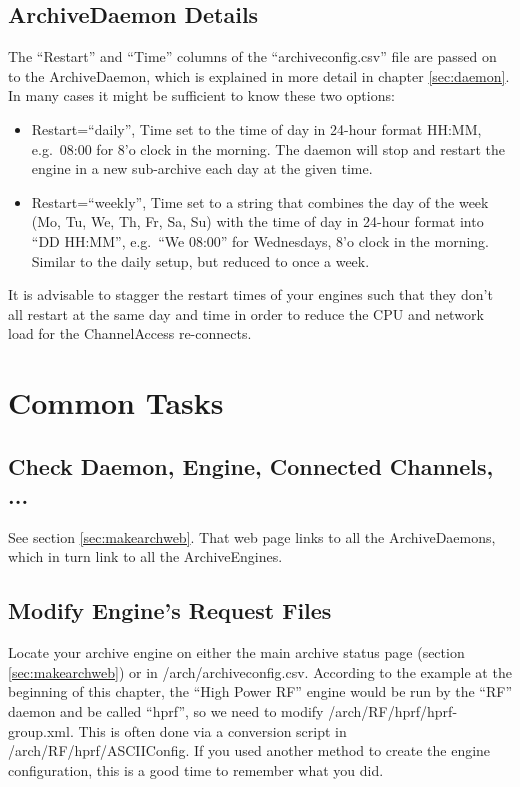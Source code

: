 \subsection{ArchiveDaemon Details}
The ``Restart'' and ``Time'' columns of the ``archiveconfig.csv'' file
are passed on to the ArchiveDaemon, which is explained in more detail
in chapter \ref{sec:daemon}. In many cases it might be sufficient to
know these two options:
\begin{itemize}
\item Restart=``daily'', Time set to the time of day in 24-hour
      format HH:MM, e.g.\ 08:00 for 8'o clock in the morning.
      The daemon will stop and restart the engine in a new sub-archive
      each day at the given time.
\item Restart=``weekly'', Time set to a string that combines the day
      of the week (Mo, Tu,  We, Th, Fr, Sa, Su) with the time of day in 24-hour
      format into ``DD HH:MM'', e.g.\ ``We 08:00'' for Wednesdays, 8'o
      clock in the morning. Similar to the daily setup, but reduced to
      once a week.
\end{itemize}
\noindent It is advisable to stagger the restart times of your engines
such that they don't all restart at the same day and time in order to
reduce the CPU and network load for the ChannelAccess re-connects.

\section{Common Tasks}

\subsection{Check Daemon, Engine, Connected Channels, ...}
See section \ref{sec:makearchweb}. That web page links to all
the ArchiveDaemons, which in turn link to all the ArchiveEngines.

\subsection{Modify Engine's Request Files}
Locate your archive engine on either the main archive status page
(section  \ref{sec:makearchweb}) or in /arch/archiveconfig.csv.
According to the example at the beginning of this chapter, the ``High
Power RF'' engine would be run by the ``RF'' daemon and be called
``hprf'', so we need to modify /arch/RF/hprf/hprf-group.xml.
This is often done via a conversion script in
/arch/RF/hprf/ASCIIConfig. If you used another method to create the
engine configuration, this is a good time to remember what you did.

